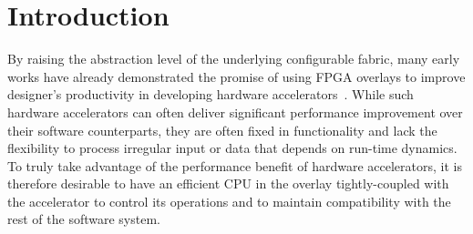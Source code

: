 \section{Introduction}
\label{sec:introduction}
By raising the abstraction level of the underlying configurable fabric, many early works have already demonstrated the promise of using FPGA overlays to improve designer's productivity in developing hardware accelerators~\cite{quickdough_fsp, quickdough}.
While such hardware accelerators can often deliver significant performance improvement over their software counterparts, they are often fixed in functionality and lack the flexibility to process irregular input or data that depends on run-time dynamics.
To truly take advantage of the performance benefit of hardware accelerators, it is therefore desirable to have an efficient CPU in the overlay tightly-coupled with the accelerator to control its operations and to maintain compatibility with the rest of the software system.





